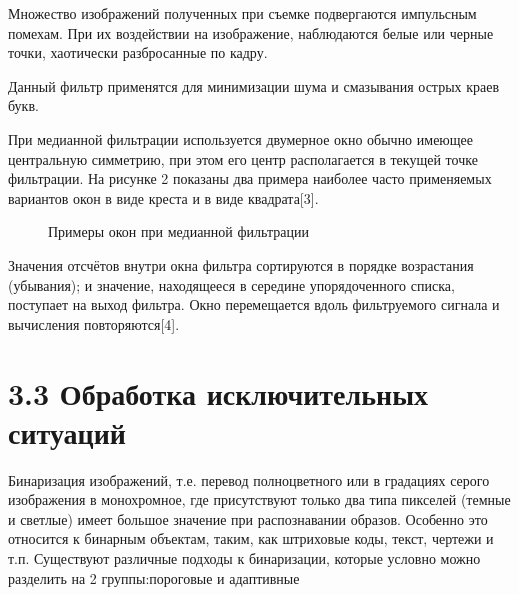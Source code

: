 \documentclass[14pt,a4paper]{extreport}
\begin{document}
   \hspace{4ex} Множество изображений полученных при съемке подвергаются импульсным помехам. При их воздействии на изображение, наблюдаются белые или черные точки, хаотически разбросанные по кадру.\
   
   \hspace{4ex} Данный фильтр применятся для минимизации шума и смазывания острых краев букв.\
   
   \hspace{4ex} При медианной фильтрации используется двумерное окно обычно имеющее центральную симметрию, при этом его центр располагается в текущей точке фильтрации. На рисунке 2 показаны два примера наиболее часто применяемых вариантов окон в виде креста и в виде квадрата[3].\

\begin{figure}[h!]
\caption{Примеры окон при медианной фильтрации}
\end{figure}

   \hspace{4ex}Значения отсчётов внутри окна фильтра сортируются в порядке возрастания (убывания); и значение, находящееся в середине упорядоченного списка, поступает на выход фильтра. Окно перемещается вдоль фильтруемого сигнала и вычисления повторяются[4].\
  

                  \section*{\normalsize\hspace{4ex}3.3 Обработка исключительных ситуаций}

\hspace{4ex} Бинаризация изображений, т.е. перевод полноцветного или в градациях серого изображения в монохромное, где присутствуют только два типа пикселей (темные и светлые) имеет большое значение при распознавании образов. Особенно это относится к бинарным объектам, таким, как штриховые коды, текст, чертежи и т.п. Существуют различные подходы к бинаризации, которые условно можно разделить на 2 группы:пороговые и адаптивные\
\end{document}
